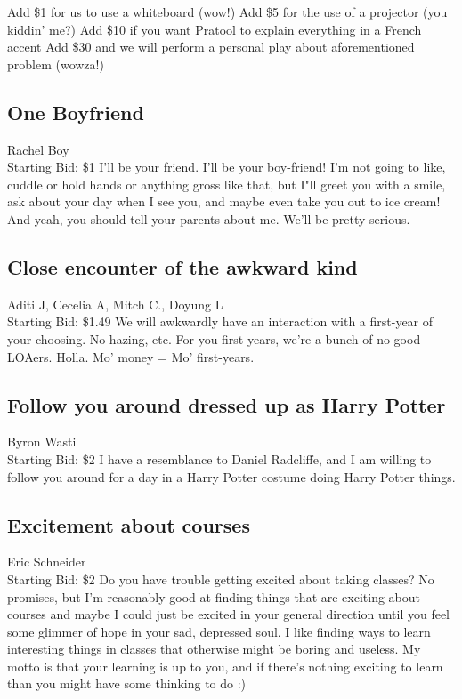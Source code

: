 \documentclass[11pt]{article}
\begin{document}
Add \$1 for us to use a whiteboard (wow!)
Add \$5 for the use of a projector (you kiddin' me?)
Add \$10 if you want Pratool to explain everything in a French accent
Add \$30 and we will perform a personal play about aforementioned problem (wowza!)
\subsection{One Boyfriend}
Rachel Boy
\\
Starting Bid: \$1
\newline
I'll be your friend.  I'll be your boy-friend!  I'm not going to like, cuddle or hold hands or anything gross like that, but I"ll greet you with a smile, ask about your day when I see you, and maybe even take you out to ice cream! And yeah, you should tell your parents about me.  We'll be pretty serious.
\subsection{Close encounter of the awkward kind}
Aditi J, Cecelia A, Mitch C., Doyung L
\\
Starting Bid: \$1.49
\newline
We will awkwardly have an interaction with a first-year of your choosing. No hazing, etc. For you first-years, we're a bunch of no good LOAers. Holla. Mo' money = Mo' first-years.
\subsection{Follow you around dressed up as Harry Potter}
Byron Wasti
\\
Starting Bid: \$2
\newline
I have a resemblance to Daniel Radcliffe, and I am willing to follow you around for a day in a Harry Potter costume doing Harry Potter things.
\subsection{Excitement about courses}
Eric Schneider
\\
Starting Bid: \$2
\newline
Do you have trouble getting excited about taking classes? No promises, but I'm reasonably good at finding things that are exciting about courses and maybe I could just be excited in your general direction until you feel some glimmer of hope in your sad, depressed soul. I like finding ways to learn interesting things in classes that otherwise might be boring and useless. My motto is that your learning is up to you, and if there's nothing exciting to learn than you might have some thinking to do :)
\end{document}
